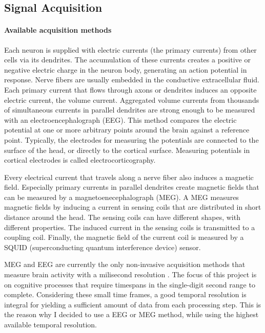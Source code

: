 \subsection{Signal Acquisition}
\paragraph{Available acquisition methods}
Each neuron is supplied with electric currents (the primary currents) from other cells via its dendrites.
The accumulation of these currents creates a positive or negative electric charge in the neuron body, generating an action potential in response.
Nerve fibers are usually embedded in the conductive extracellular fluid.
Each primary current that flows through axons or dendrites induces an opposite electric current, the volume current.
Aggregated volume currents from thousands of simultaneous currents in parallel dendrites are strong enough to be measured with an electroencephalograph (EEG).
This method compares the electric potential at one or more arbitrary points around the brain against a reference point.
Typically, the electrodes for measuring the potentials are connected to the surface of the head, or directly to the cortical surface.
Measuring potentials in cortical electrodes is called electrocorticography.

Every electrical current that travels along a nerve fiber also induces a magnetic field.
Especially primary currents in parallel dendrites create magnetic fields that can be measured by a magnetoenecephalograph (MEG).
A MEG measures magnetic fields by inducing a current in sensing coils that are distributed in short distance around the head.
The sensing coils can have different shapes, with different properties.
The induced current in the sensing coils is transmitted to a coupling coil.
Finally, the magnetic field of the current coil is measured by a SQUID (superconducting quantum interference device) sensor.

MEG and EEG are currently the only non-invasive acquisition methods that measure brain activity with a milisecond resolution \cite{1.5.MEG.a}\cite{1.5.MEG.b}\cite{1.5.MEG.c}.
The focus of this project is on cognitive processes that require timespans in the single-digit second range to complete.
Considering these small time frames, a good temporal resolution is integral for yielding a sufficient amount of data from each processing step.
This is the reason why I decided to use a EEG or MEG method, while using the highest available temporal resolution.

